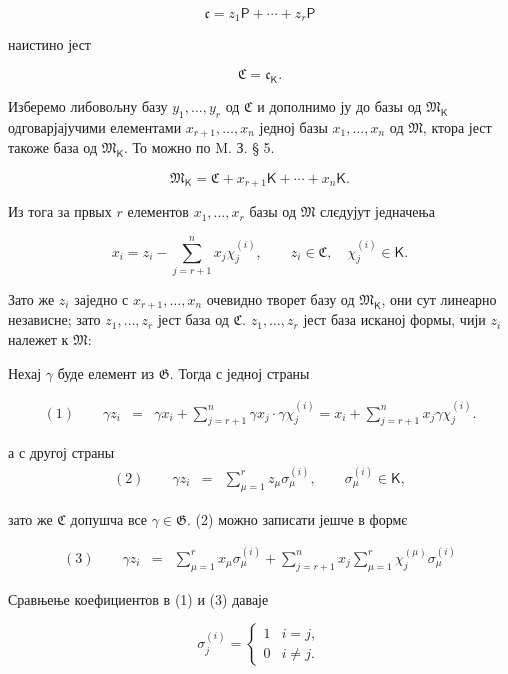 \documentclass[11pt]{article}
\begin{document}
\[
\mathfrak c=z_1\mathsf P+\cdots+z_r\mathsf P
\]

наистино јест

\[
\mathfrak C=\mathfrak c_{\mathsf K}.
\]

Изберемо либовољну базу \(y_1,\ldots,y_r\) од \(\mathfrak C\) и дополнимо ју до базы од \(\mathfrak M_{\mathsf K}\) одговарјајучими елементами \(x_{r+1},\ldots,x_n\) једној базы \(x_1,\ldots,x_n\) од \(\mathfrak M\), ктора јест такоже база од \(\mathfrak M_{\mathsf K}\). То можно по M. З. § 5.

\[
\mathfrak M_{\mathsf K}=\mathfrak C+x_{r+1}\mathsf K+\cdots+x_n\mathsf K.
\]

Из тога за првых \(r\) елементов \(x_1,\ldots,x_r\) базы од \(\mathfrak M\) слєдујут једначења

\[
x_i=z_i-\sum_{j=r+1}^{n}x_j\chi_j^{(i)},\qquad
z_i\in\mathfrak C,\quad \chi_j^{(i)}\in\mathsf K.
\]

Зато же \(z_i\) заједно с \(x_{r+1},\ldots,x_n\) очевидно творет базу од \(\mathfrak M_{\mathsf K}\), они сут линеарно независне; зато \(z_1,\ldots,z_r\) јест база од \(\mathfrak C\). \(z_1,\ldots,z_r\) јест база исканој формы, чији \(z_i\) належет к \(\mathfrak M\):

Нехај \(\gamma\) буде елемент из \(\mathfrak G\). Тогда с једној страны

\[
\begin{array}{rcl}
(1)\qquad \gamma z_i
&=&\gamma x_i+\displaystyle\sum_{j=r+1}^{n}\gamma x_j\cdot \gamma\chi_j^{(i)}
=x_i+\displaystyle\sum_{j=r+1}^{n}x_j\gamma\chi_j^{(i)}.
\end{array}
\]

а с другој страны
\[
\begin{array}{rcl}
(2)\qquad \gamma z_i&=&\displaystyle\sum_{\mu=1}^{r}z_\mu\sigma_\mu^{(i)},
\qquad \sigma_\mu^{(i)}\in\mathsf K,
\end{array}
\]

зато же \(\mathfrak C\) допушча все \(\gamma\in\mathfrak G\). (2) можно записати јешче в формє

\[
\begin{array}{rcl}
(3)\qquad \gamma z_i
&=&\displaystyle\sum_{\mu=1}^{r}x_\mu\sigma_\mu^{(i)}
+\displaystyle\sum_{j=r+1}^{n}x_j\sum_{\mu=1}^{r}\chi_j^{(\mu)}\sigma_\mu^{(i)}
\end{array}
\]

Сравњење коефициентов в (1) и (3) даваје

\[
\sigma_j^{(i)}=
\begin{cases}
1 & i=j,\\
0 & i\ne j.
\end{cases}
\]
\end{document}
